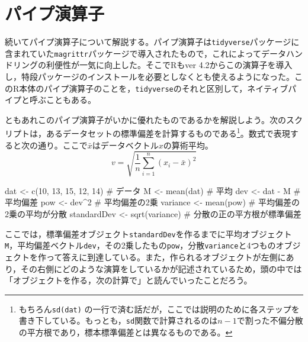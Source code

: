 \documentclass[
  a4paper,
]{ltjsbook}
\newenvironment{Shaded}{\begin{snugshade}}{\end{snugshade}}
\newcommand{\CommentTok}[1]{\textcolor[rgb]{0.37,0.37,0.37}{#1}}
\newcommand{\DecValTok}[1]{\textcolor[rgb]{0.68,0.00,0.00}{#1}}
\newcommand{\FunctionTok}[1]{\textcolor[rgb]{0.28,0.35,0.67}{#1}}
\newcommand{\NormalTok}[1]{\textcolor[rgb]{0.00,0.23,0.31}{#1}}
\newcommand{\OtherTok}[1]{\textcolor[rgb]{0.00,0.23,0.31}{#1}}
\newcommand{\SpecialCharTok}[1]{\textcolor[rgb]{0.37,0.37,0.37}{#1}}
\begin{document}
\section{パイプ演算子}\label{ux30d1ux30a4ux30d7ux6f14ux7b97ux5b50}

続いてパイプ演算子について解説する。パイプ演算子は\texttt{tidyverse}パッケージに含まれていた\texttt{magrittr}パッケージで導入されたもので，これによってデータハンドリングの利便性が一気に向上した。そこでRもver
4.2からこの演算子を導入し，特段パッケージのインストールを必要としなくとも使えるようになった。このR本体のパイプ演算子のことを，\texttt{tidyverse}のそれと区別して，ネイティブパイプと呼ぶこともある。

ともあれこのパイプ演算子がいかに優れたものであるかを解説しよう。次のスクリプトは，あるデータセットの標準偏差を計算するものである\footnote{もちろん\texttt{sd(dat)}
  の一行で済む話だが，ここでは説明のために各ステップを書き下している。もっとも，\texttt{sd}関数で計算されるのは\(n-1\)で割った不偏分散の平方根であり，標本標準偏差とは異なるものである。}。数式で表現すると次の通り。ここで\(\bar{x}\)はデータベクトル\(x\)の算術平均。
\[v = \sqrt{\frac{1}{n}\sum_{i=1}^n (x_i - \bar{x})^2}\]

\begin{Shaded}
\begin{Highlighting}[]
\NormalTok{dat }\OtherTok{\textless{}{-}} \FunctionTok{c}\NormalTok{(}\DecValTok{10}\NormalTok{, }\DecValTok{13}\NormalTok{, }\DecValTok{15}\NormalTok{, }\DecValTok{12}\NormalTok{, }\DecValTok{14}\NormalTok{) }\CommentTok{\# データ}
\NormalTok{M }\OtherTok{\textless{}{-}} \FunctionTok{mean}\NormalTok{(dat) }\CommentTok{\# 平均}
\NormalTok{dev }\OtherTok{\textless{}{-}}\NormalTok{ dat }\SpecialCharTok{{-}}\NormalTok{ M }\CommentTok{\# 平均偏差}
\NormalTok{pow }\OtherTok{\textless{}{-}}\NormalTok{ dev}\SpecialCharTok{\^{}}\DecValTok{2} \CommentTok{\# 平均偏差の2乗}
\NormalTok{variance }\OtherTok{\textless{}{-}} \FunctionTok{mean}\NormalTok{(pow) }\CommentTok{\# 平均偏差の2乗の平均が分散}
\NormalTok{standardDev }\OtherTok{\textless{}{-}} \FunctionTok{sqrt}\NormalTok{(variance) }\CommentTok{\# 分散の正の平方根が標準偏差}
\end{Highlighting}
\end{Shaded}

ここでは，標準偏差オブジェクト\texttt{standardDev}を作るまでに平均オブジェクト\texttt{M}，平均偏差ベクトル\texttt{dev}，その2乗したもの\texttt{pow}，分散\texttt{variance}と4つものオブジェクトを作って答えに到達している。また，作られるオブジェクトが左側にあり，その右側にどのような演算をしているかが記述されているため，頭の中では「オブジェクトを作る，次の計算で」と読んでいったことだろう。
\end{document}
